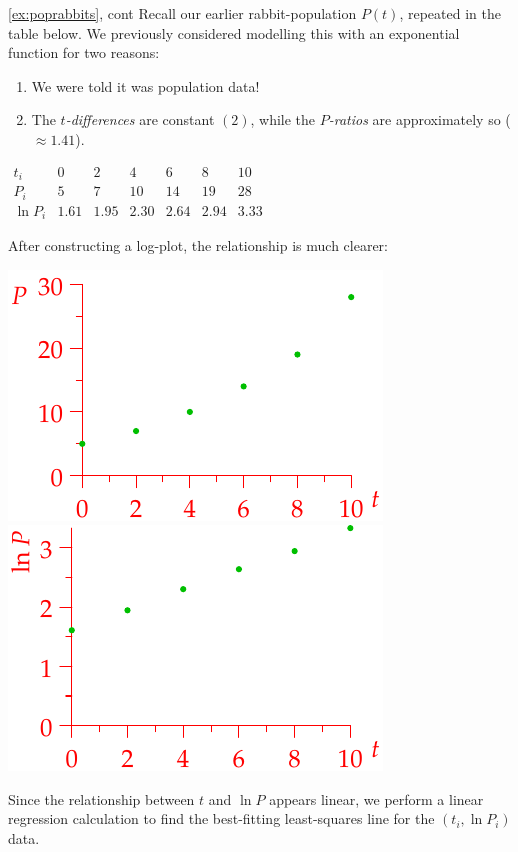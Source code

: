 \begin{example*}{\ref{ex:poprabbits}, cont}{}
Recall our earlier rabbit-population $P(t)$, repeated in the table below. We previously considered modelling this with an exponential function for two reasons:\par
\begin{minipage}[t]{0.55\linewidth}\vspace{-6pt}
\begin{enumerate}\itemsep0pt
  \item We were told it was population data!
  \item The \emph{$t$-differences} are constant $(2)$, while the \emph{$P$-ratios} are approximately so ($\approx 1.41$).
\end{enumerate}
\end{minipage}
\hfill
\begin{minipage}[t]{0.44\linewidth}\vspace{0pt}
\flushright $\begin{array}{c|cccccc}
t_i&0&2&4&6&8&10\\\hline
P_i&5&7&10&14&19&28\\\hline\hline
\ln P_i&1.61&1.95&2.30&2.64&2.94&3.33
\end{array}$
\end{minipage}\medbreak
After constructing a log-plot, the relationship is much clearer:
\begin{center}
\includegraphics{rabbits3}
\qquad\qquad
\includegraphics{rabbits4}
\end{center}
Since the relationship between $t$ and $\ln P$ appears linear, we perform a linear regression calculation to find the best-fitting least-squares line for the $(t_i,\ln P_i)$ data.\par


\end{example*}
